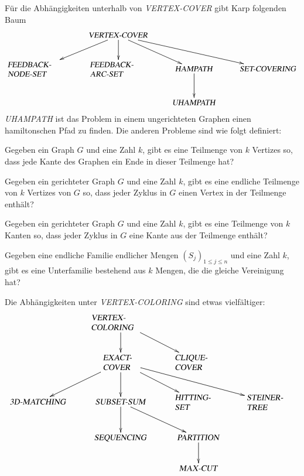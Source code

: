 Für die Abhängigkeiten unterhalb von \textsl{VERTEX-COVER} gibt 
Karp folgenden Baum
\[
\xymatrix{
	&\text{\textsl{VERTEX-COVER}} \ar[dl] \ar[d]\ar[dr]\ar[drr]
\\
\begin{minipage}{1.0truein}
\textsl{FEEDBACK-NODE-SET}
\end{minipage}
	&\begin{minipage}{1.0truein}\textsl{FEEDBACK-ARC-SET}\end{minipage}
		&\text{\textsl{HAMPATH}}\ar[d]
			&\text{\textsl{SET-COVERING}}
\\
	&
		&\text{\textsl{UHAMPATH}}
}
\]
\textsl{UHAMPATH} ist das Problem in einem ungerichteten Graphen
einen hamiltonschen Pfad zu finden.
Die anderen Probleme sind wie folgt definiert:
\begin{description}
%
\item[\textsl{VERTEX-COVER}:] Gegeben ein Graph $G$ und eine Zahl
$k$, gibt es eine Teilmenge von $k$ Vertizes so, dass jede
Kante des Graphen ein Ende in dieser Teilmenge hat?
%
\item[\textsl{FEEDBACK-NODE-SET}:] Gegeben ein gerichteter Graph $G$
und eine Zahl $k$, gibt es eine endliche Teilmenge von $k$ Vertizes
von $G$ so, dass jeder Zyklus in $G$ einen Vertex in der Teilmenge 
enthält?
%
\item[\textsl{FEEDBACK-ARC-SET}:] Gegeben ein gerichteter Graph $G$
und eine Zahl $k$, gibt es eine Teilmenge von $k$ Kanten so, dass
jeder Zyklus in $G$ eine Kante aus der Teilmenge enthält?
%
\item[\textsl{SET-COVERING}:] Gegeben eine endliche Familie endlicher
Mengen $(S_j)_{1\le j\le n}$ und eine Zahl $k$, gibt es eine Unterfamilie
bestehend aus $k$ Mengen, die die gleiche Vereinigung hat?
\end{description}
Die Abhängigkeiten unter \textsl{VERTEX-COLORING} sind etwas vielfältiger:
\[
\xymatrix{
	&\begin{minipage}{1truein}
	\textsl{VERTEX-COLORING}
	\end{minipage} \ar[d]\ar[dr]
\\
	&\begin{minipage}{0.6truein}
	\textsl{EXACT-COVER}
	\end{minipage} \ar[dl] \ar[d] \ar[dr] \ar[drr]
		&\begin{minipage}{0.8truein}
		\textsl{CLIQUE-COVER}
		\end{minipage} 
\\
\text{\textsl{3D-MATCHING}}
	&\text{\textsl{SUBSET-SUM}} \ar[dr] \ar[d]
		&\begin{minipage}{0.8truein}
		\textsl{HITTING-SET}
		\end{minipage}
			&\begin{minipage}{0.8truein}
			\textsl{STEINER-TREE}
			\end{minipage}
\\
	&\text{\textsl{SEQUENCING}}
		&\text{\textsl{PARTITION}} \ar[d]
\\
	&
		&\text{\textsl{MAX-CUT}}
}
\]
